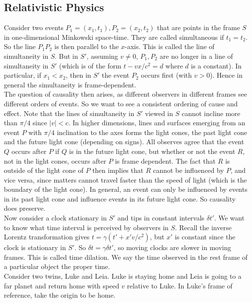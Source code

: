 \subsection{Relativistic Physics}
Consider two events $P_1=(x_1,t_1),P_2=(x_2,t_2)$ that are points in the frame $S$ in one-dimensional Minkowski space-time.
They are called simultaneous if $t_1=t_2$.\\
So the line $P_1P_2$ is then parallel to the $x$-axis.
This is called the line of simultaneity in $S$.
But in $S'$, assuming $v\neq 0$, $P_1,P_2$ are no longer in a line of simultaneity in $S'$ (which is of the form $t-vx/c^2=d$ where $d$ is a constant).
In particular, if $x_1<x_2$, then in $S'$ the event $P_2$ occurs first (with $v>0$).
Hence in general the simultaneity is frame-dependent.\\
The question of causality then arises, as different observers in different frames see different orders of events.
So we want to see a consistent ordering of cause and effect.
Note that the lines of simultaneity in $S'$ viewed in $S$ cannot incline more than $\pi/4$ since $|v|<c$.
In higher dimensions, lines and surfaces emerging from an event $P$ with $\pi/4$ inclination to the axes forms the light cones, the past light cone and the future light cone (depending on signs).
All observes agree that the event $Q$ occurs after $P$ if $Q$ is in the future light cone, but whether or not the event $R$, not in the light cones, occurs after $P$ is frame dependent.
The fact that $R$ is outside of the light cone of $P$ then implies that $R$ cannot be influenced by $P$, and vice versa, since matters cannot travel faster than the speed of light (which is the boundary of the light cone).
In general, an event can only be influenced by events in its past light cone and influence events in its future light cone.
So causality does preserve.\\
Now consider a clock stationary in $S'$ and tips in constant intervals $\delta t'$.
We want to know what time interval is perceived by observers in $S$.
Recall the inverse Lorentz transformation gives $t=\gamma(t'+x'v/c^2)$, but $x'$ is constant since the clock is stationary in $S'$.
So $\delta t=\gamma\delta t'$, so moving clocks are slower in moving frames.
This is called time dilation.
We say the time observed in the rest frame of a particular object the proper time.\\
Consider two twins, Luke and Leia.
Luke is staying home and Leia is going to a far planet and return home with speed $v$ relative to Luke.
In Luke's frame of reference, take the origin to be home.
